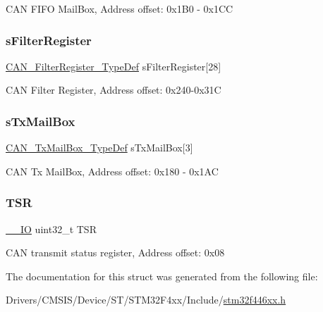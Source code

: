 C\+AN F\+I\+FO Mail\+Box, Address offset\+: 0x1\+B0 -\/ 0x1\+CC \mbox{\label{struct_c_a_n___type_def_a31bd74513e6e599319702ad34113bf59}} 
\subsubsection{\texorpdfstring{s\+Filter\+Register}{sFilterRegister}}
{\footnotesize\ttfamily \mbox{\hyperlink{struct_c_a_n___filter_register___type_def}{C\+A\+N\+\_\+\+Filter\+Register\+\_\+\+Type\+Def}} s\+Filter\+Register\mbox{[}28\mbox{]}}

C\+AN Filter Register, Address offset\+: 0x240-\/0x31C \mbox{\label{struct_c_a_n___type_def_ae37503ab1a7bbd29846f94cdadf0a9ef}} 
\subsubsection{\texorpdfstring{s\+Tx\+Mail\+Box}{sTxMailBox}}
{\footnotesize\ttfamily \mbox{\hyperlink{struct_c_a_n___tx_mail_box___type_def}{C\+A\+N\+\_\+\+Tx\+Mail\+Box\+\_\+\+Type\+Def}} s\+Tx\+Mail\+Box\mbox{[}3\mbox{]}}

C\+AN Tx Mail\+Box, Address offset\+: 0x180 -\/ 0x1\+AC \mbox{\label{struct_c_a_n___type_def_a87e3001757a0cd493785f1f3337dd0e8}} 
\subsubsection{\texorpdfstring{T\+SR}{TSR}}
{\footnotesize\ttfamily \mbox{\hyperlink{core__sc300_8h_aec43007d9998a0a0e01faede4133d6be}{\+\_\+\+\_\+\+IO}} uint32\+\_\+t T\+SR}

C\+AN transmit status register, Address offset\+: 0x08 

The documentation for this struct was generated from the following file\+:\begin{DoxyCompactItemize}
\item 
Drivers/\+C\+M\+S\+I\+S/\+Device/\+S\+T/\+S\+T\+M32\+F4xx/\+Include/\mbox{\hyperlink{stm32f446xx_8h}{stm32f446xx.\+h}}\end{DoxyCompactItemize}
